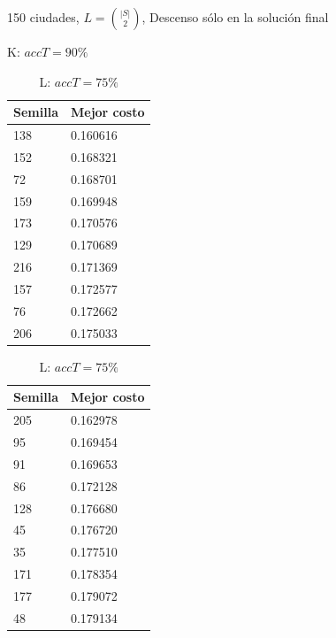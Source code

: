 \documentclass{article}
\begin{document}
  \begin{table}[!htbp]
    \caption{150 ciudades, 
             $L=\binom{|S|}{2}$, 
             Descenso sólo en la solución final}
    \begin{minipage}{.5\linewidth}
      \caption{K: $accT = 90 \%$}
      \centering
      \begin{tabular}{l|l}
        Semilla & Mejor costo \\
        \hline
        138     & 0.160616 \\
        \hline
        152     & 0.168321 \\
        \hline
        72      & 0.168701 \\
        \hline
        159     & 0.169948 \\
        \hline
        173     & 0.170576 \\
        \hline
        129     & 0.170689 \\
        \hline
        216     & 0.171369 \\
        \hline
        157     & 0.172577 \\
        \hline
        76      & 0.172662 \\
        \hline
        206     & 0.175033 \\
      \end{tabular}
    \end{minipage}%
    \begin{minipage}{.5\linewidth}
      \centering
      \caption{L: $accT = 75 \%$}
      \begin{tabular}{l|l}
        Semilla & Mejor costo \\
        \hline
        205     & 0.162978 \\
        \hline
        95      & 0.169454 \\
        \hline
        91      & 0.169653 \\
        \hline
        86      & 0.172128 \\
        \hline
        128     & 0.176680 \\
        \hline
        45      & 0.176720 \\
        \hline
        35      & 0.177510 \\
        \hline
        171     & 0.178354 \\
        \hline
        177     & 0.179072 \\
        \hline
        48      & 0.179134 \\
      \end{tabular}
    \end{minipage}
  \end{table}
\end{document}
